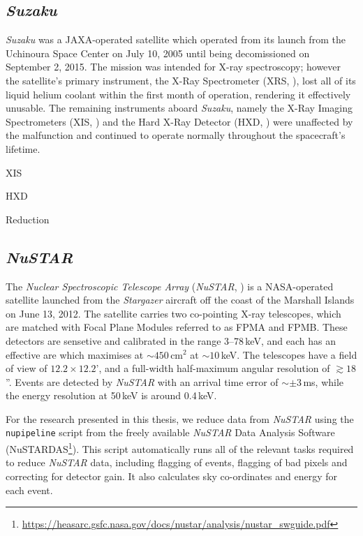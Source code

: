 \subsection{\textit{Suzaku}}

\par \textit{Suzaku} \citep{Mitsuda_Suzaku} was a JAXA-operated satellite which operated from its launch from the Uchinoura Space Center on July 10, 2005 until being decomissioned on September 2, 2015.  The mission was intended for X-ray spectroscopy; however the satellite's primary instrument, the X-Ray Spectrometer (XRS, \citealp{Kelley_XRS}), lost all of its liquid helium coolant within the first month of operation, rendering it effectively unusable.  The remaining instruments aboard \textit{Suzaku}, namely the X-Ray Imaging Spectrometers (XIS, \citealp{Koyama_XIS}) and the Hard X-Ray Detector (HXD, \citealp{Takahashi_HXD}) were unaffected by the malfunction and continued to operate normally throughout the spacecraft's lifetime.
\par XIS 
\par HXD 
\par Reduction 

\subsection{\textit{NuSTAR}}

\par The \textit{Nuclear Spectroscopic Telescope Array} (\textit{NuSTAR}, \citealp{Harrison_NuStar}) is a NASA-operated satellite launched from the \textit{Stargazer} aircraft off the coast of the Marshall Islands on June 13, 2012.  The satellite carries two co-pointing X-ray telescopes, which are matched with Focal Plane Modules referred to as FPMA and FPMB.  These detectors are sensetive and calibrated in the range 3--78\,keV, and each has an effective are which maximises at $\sim450$\,cm$^2$ at $\sim10$\,keV.  The telescopes have a field of view of $12.2\times12.2$', and a full-width half-maximum angular resolution of $\gtrsim18$''.  Events are detected by \textit{NuSTAR} with an arrival time error of $\sim\pm3$\,ms, while the energy resolution at 50\,keV is around 0.4\,keV.
\par For the research presented in this thesis, we reduce data from \textit{NuSTAR} using the \texttt{nupipeline} script from the freely available \textit{NuSTAR} Data Analysis Software (NuSTARDAS\footnote{\url{https://heasarc.gsfc.nasa.gov/docs/nustar/analysis/nustar_swguide.pdf}}).  This script automatically runs all of the relevant tasks required to reduce \textit{NuSTAR} data, including flagging of events, flagging of bad pixels and correcting for detector gain.  It also calculates sky co-ordinates and energy for each event.

